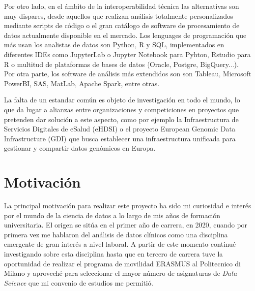 Por otro lado, en el ámbito de la interoperabilidad técnica las alternativas son muy dispares, desde aquellos que realizan análisis totalmente personalizados mediante scripts de código o el gran catálogo de software de procesamiento de datos actualmente disponible en el mercado. Los lenguages de programación que más usan los analistas de datos son Python, R y SQL, implementados en diferentes IDEs como JupyterLab o Jupyter Notebook para Pyhton, Rstudio para R o multitud de plataformas de bases de datos (Oracle, Postgre, BigQuery...). Por otra parte, los software de análisis más extendidos son son Tableau, Microsoft PowerBI, SAS, MatLab, Apache Spark, entre otras. 


La falta de un estandar común es objeto de investigación en todo el mundo, lo que da lugar a alianzas entre organizaciones y competiciones en proyectos que pretenden dar solución a este aspecto, como por ejemplo la Infraestructura de Servicios Digitales de eSalud (eHDSI) \cite{DHE2023eHDSI} %
o el proyecto European Genomic Data Infrastructure (GDI) \cite{GDI2022GDI} que busca establecer una infraestructura unificada para gestionar y compartir datos genómicos en Europa.



\section{Motivación} \label{sec:01Motivacion}


La principal motivación para realizar este proyecto ha sido mi curiosidad e interés por el mundo de la ciencia de datos a lo largo de mis años de formación universitaria. El origen se sitúa en el primer año de carrera, en 2020, cuando por primera vez me hablaron del análisis de datos clínicos como una disciplina emergente de gran interés a nivel laboral. A partir de este momento continué investigando sobre esta disciplina hasta que en tercero de carrera tuve la oportunidad de realizar el programa de movilidad ERASMUS al Politecnico di Milano y aproveché para seleccionar el mayor número de asignaturas de \textit{Data Science} que mi convenio de estudios me permitió. 

